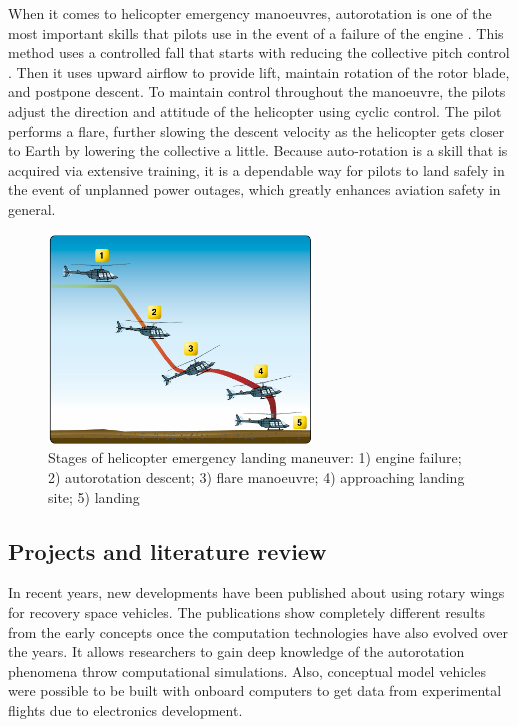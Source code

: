 When it comes to helicopter emergency manoeuvres, autorotation is one of the most important skills that pilots use in the event of a failure of the engine \cite{federal_aviation_administration_helicopter_2021}. This method uses a controlled fall that starts with reducing the collective pitch control \cite{federal_aviation_administration_helicopter_2021}. Then it uses upward airflow to provide lift, maintain rotation of the rotor  blade, and postpone descent. To maintain control throughout the manoeuvre, the pilots adjust the direction  and attitude of the helicopter using cyclic control. The pilot performs a flare, further slowing the descent  velocity as the helicopter gets closer to Earth by lowering the collective a little. Because auto-rotation is a skill that is acquired via extensive training, it is a dependable way for pilots to land safely in the event of unplanned power outages, which greatly enhances aviation safety in general.

 \begin{figure}[!htb]
    \centering
    \includegraphics[width=7cm]{Figures/introduction/helicopter maneuver.png}
    \caption{Stages of helicopter emergency landing maneuver: 1) engine failure; 2) autorotation descent; 3) flare manoeuvre; 4) approaching landing site; 5) landing}
    \label{fig:helicopter-maneuver}
\end{figure}

\subsection{Projects and literature review}

In recent years, new developments have been published about using rotary wings for recovery space vehicles. The publications show completely different results from the early concepts once the computation technologies have also evolved over the years. It allows researchers to gain deep knowledge of the autorotation phenomena throw computational simulations. Also, conceptual model vehicles were possible to be built with onboard computers to get data from experimental flights due to electronics development.

